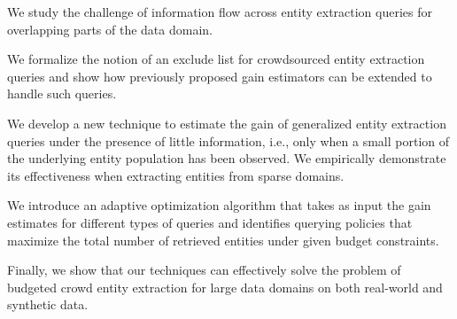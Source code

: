 \squishlist
\item We study the challenge of information flow across entity extraction queries for overlapping parts of the data domain.
\item We formalize the notion of an exclude list for crowdsourced entity extraction queries and show how previously proposed gain estimators can be extended to handle such queries.
\item We develop a new technique to estimate the gain of generalized entity extraction queries under the presence of little information, i.e., only when a small portion of the underlying entity population has been observed. We empirically demonstrate its effectiveness when extracting entities from sparse domains.
\item We introduce an adaptive optimization algorithm that takes as input the gain estimates for different types of queries and identifies querying policies that maximize the total number of retrieved entities under given budget constraints. 
\item Finally, we show that our techniques can effectively solve the problem of budgeted crowd entity extraction for large data domains on both real-world and synthetic data.
\squishend

